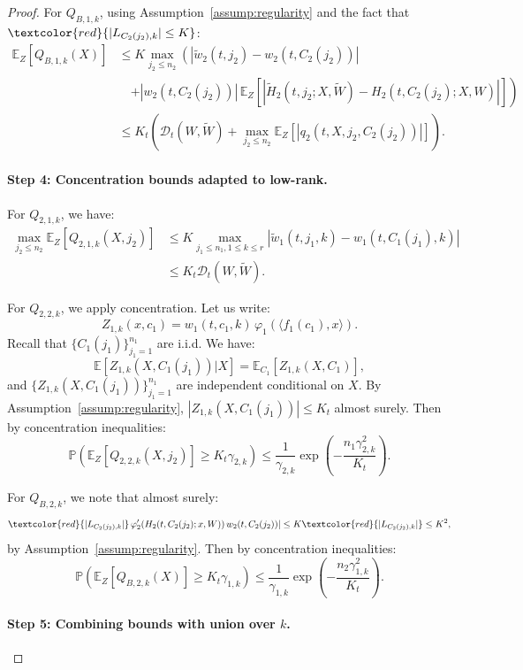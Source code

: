 \begin{proof}
For $Q_{B,1,k}$, using Assumption~\ref{assump:regularity} and the fact that $\textcolor{red}{|L_{C_2(j_2),k}| \le K}$:
\begin{align*}
\mathbb{E}_Z[Q_{B,1,k}(X)] &\le K\max_{j_2 \le n_2}\left(|\tilde{w}_2(t, j_2) - w_2(t, C_2(j_2))|\right.\\
&\quad\left. + |w_2(t, C_2(j_2))|\,\mathbb{E}_Z[|\tilde{H}_2(t, j_2; X, \tilde{W}) - H_2(t, C_2(j_2); X, W)|]\right)\\
&\le K_t\left(\mathscr{D}_t(W, \tilde{W}) + \max_{j_2 \le n_2}\mathbb{E}_Z[|q_2(t, X, j_2, C_2(j_2))|]\right).
\end{align*}

\paragraph*{Step 4: Concentration bounds adapted to low-rank.}

For $Q_{2,1,k}$, we have:
\begin{align*}
\max_{j_2 \le n_2}\mathbb{E}_Z[Q_{2,1,k}(X, j_2)] &\le K\max_{j_1 \le n_1, 1 \le k \le r}|\tilde{w}_1(t, j_1, k) - w_1(t, C_1(j_1), k)|\\
&\le K_t\mathscr{D}_t(W, \tilde{W}).
\end{align*}

For $Q_{2,2,k}$, we apply concentration. Let us write:
\[
Z_{1,k}(x, c_1) = w_1(t, c_1, k)\,\varphi_1(\langle f_1(c_1), x\rangle).
\]
Recall that $\{C_1(j_1)\}_{j_1=1}^{n_1}$ are i.i.d. We have:
\[
\mathbb{E}[Z_{1,k}(X, C_1(j_1))|X] = \mathbb{E}_{C_1}[Z_{1,k}(X, C_1)],
\]
and $\{Z_{1,k}(X, C_1(j_1))\}_{j_1=1}^{n_1}$ are independent conditional on $X$. By Assumption~\ref{assump:regularity}, $|Z_{1,k}(X, C_1(j_1))| \le K_t$ almost surely. Then by concentration inequalities:
\[
\mathbb{P}\left(\mathbb{E}_Z[Q_{2,2,k}(X, j_2)] \ge K_t\gamma_{2,k}\right) \le \frac{1}{\gamma_{2,k}}\exp\left(-\frac{n_1\gamma_{2,k}^2}{K_t}\right).
\]

For $Q_{B,2,k}$, we note that almost surely:
\[
\textcolor{red}{|L_{C_2(j_2),k}|}\,\varphi_2'(H_2(t, C_2(j_2); x, W))\,w_2(t, C_2(j_2))| \le K\textcolor{red}{|L_{C_2(j_2),k}|} \le K^2,
\]
by Assumption~\ref{assump:regularity}. Then by concentration inequalities:
\[
\mathbb{P}\left(\mathbb{E}_Z[Q_{B,2,k}(X)] \ge K_t\gamma_{1,k}\right) \le \frac{1}{\gamma_{1,k}}\exp\left(-\frac{n_2\gamma_{1,k}^2}{K_t}\right).
\]

\paragraph*{Step 5: Combining bounds with union over $k$.}


\end{proof}
